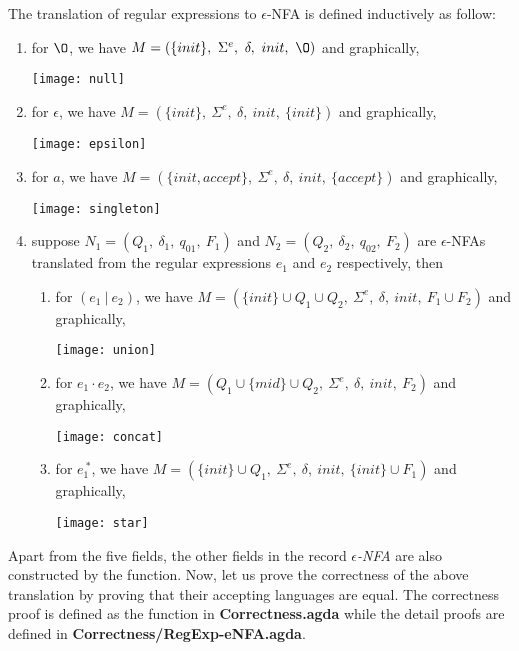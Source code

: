 \begin{defn}
\label{defn:thompson}
\noindent The translation of regular expressions
to \(\epsilon\)-NFA is defined inductively as follow:
\begin{enumerate}[nolistsep]
  \item for \(\O\), we have \(M = (\{init\},\ \Sigma^e,\ \delta,\
    init,\ \O)\) and graphically, \begin{center}\texttt{[image: null]}\end{center}
  \item for \(\epsilon\), we have \(M = (\{init\},\ \Sigma^e,\
    \delta,\ init,\ \{init\})\) and graphically, \begin{center}\texttt{[image: epsilon]}\end{center}
  \item for \(a\), we have \(M = (\{init, accept\},\ \Sigma^e,\
    \delta,\ init,\ \{accept\})\) and graphically, \begin{center}\texttt{[image: singleton]}\end{center}
  \item suppose \(N_1 = (Q_1,\ \delta_1,\ q_{01},\ F_1)\) and \(N_2 =
    (Q_2,\ \delta_2,\ q_{02},\ F_2)\) are \(\epsilon\)-NFAs translated from the
    regular expressions \(e_1\) and \(e_2\) respectively, then
    \begin{enumerate}[nolistsep]
      \item for \((e_1\ |\ e_2)\), we have \(M = (\{init\} \cup Q_1
        \cup Q_2,\ \Sigma^e,\ \delta,\ init,\ F_1 \cup F_2)\) and
        graphically, \begin{center}\texttt{[image: union]}\end{center}
      \item for \(e_1\cdot e_2\), we have \(M = (Q_1 \cup \{mid\}
        \cup Q_2,\ \Sigma^e,\ \delta,\ init,\ F_2)\) and graphically, \begin{center}\texttt{[image: concat]}\end{center}
      \item for \(e_1^{\ *}\), we have \(M = (\{init\} \cup Q_1,\
        \Sigma^e,\ \delta,\ init,\ \{init\} \cup F_1)\) and
        graphically, \begin{center}\texttt{[image: star]}\end{center}
     \end{enumerate}
\end{enumerate}
\end{defn}

\par Apart from the five fields, the other fields in the record
\textit{\(\epsilon\)-NFA} are also constructed by the function. Now, let us prove the correctness of the above translation by
proving that their accepting languages are equal. The correctness
proof is defined as the function  in
\textbf{Correctness.agda} while the detail proofs are
defined in \textbf{Correctness/RegExp-eNFA.agda}. 

